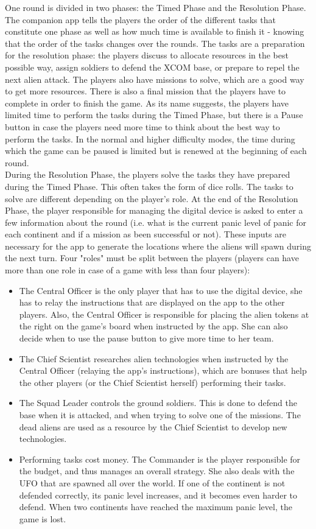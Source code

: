 One round is divided in two phases: the Timed Phase and the Resolution Phase. The companion app tells the players the order of the different tasks that constitute one phase as well as how much time is available to finish it - knowing that the order of the tasks changes over the rounds. The tasks are a preparation for the resolution phase: the players discuss to allocate resources in the best possible way, assign soldiers to defend the XCOM base, or prepare to repel the next alien attack. The players also have missions to solve, which are a good way to get more resources. There is also a final mission that the players have to complete in order to finish the game. As its name suggests, the players have limited time to perform the tasks during the Timed Phase, but there is a Pause button in case the players need more time to think about the best way to perform the tasks. In the normal and higher difficulty modes, the time during which the game can be paused is limited but is renewed at the beginning of each round.\\
During the Resolution Phase, the players solve the tasks they have prepared during the Timed Phase. This often takes the form of dice rolls. The tasks to solve are different depending on the player's role. At the end of the Resolution Phase, the player responsible for managing the digital device is asked to enter a few information about the round (i.e. what is the current panic level of panic for each continent and if a mission as been successful or not). These inputs are necessary for the app to generate the locations where the aliens will spawn during the next turn. Four "roles" must be split between the players (players can have more than one role in case of a game with less than four players):
\begin{itemize}
\item The Central Officer is the only player that has to use the digital device, she has to relay the instructions that are displayed on the app to the other players. Also, the Central Officer is responsible for placing the alien tokens at the right on the game's board when instructed by the app. She can also decide when to use the pause button to give more time to her team.
\item The Chief Scientist researches alien technologies when instructed by the Central Officer (relaying the app's instructions), which are bonuses that help the other players (or the Chief Scientist herself) performing their tasks.
\item The Squad Leader controls the ground soldiers. This is done to defend the base when it is attacked, and when trying to solve one of the missions. The dead aliens are used as a resource by the Chief Scientist to develop new technologies.
\item Performing tasks cost money. The Commander is the player responsible for the budget, and thus manages an overall strategy. She also deals with the UFO that are spawned all over the world. If one of the continent is not defended correctly, its panic level increases, and it becomes even harder to defend. When two continents have reached the maximum panic level, the game is lost.
\end{itemize}
